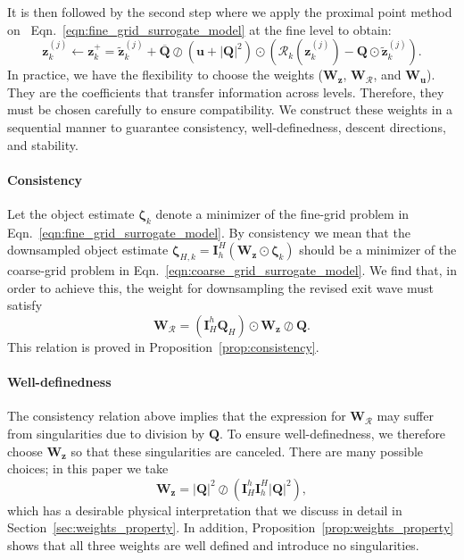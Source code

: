 \documentclass{article}
\numberwithin{equation}{section}
\begin{document}
It is then followed by the second step where we apply the proximal point method on~ Eqn.~\eqref{eqn:fine_grid_surrogate_model} at the fine level to obtain:
\begin{equation*} 
\bm{z}_k^{(j)} \leftarrow \bm{z}_k^+ = \widetilde{\bm{z}}_k^{(j)} + \overline{\bm{Q}}\oslash\left(\bm{u} + |\bm{Q}|^2\right)\odot\left(\mathcal{R}_k\left(\bm{z}_k^{(j)}\right) - \bm{Q}\odot\widetilde{\bm{z}}_k^{(j)}\right).
\end{equation*}
In practice, we have the flexibility to choose the weights ($\bm{W}_{\bm{z}}$, $\bm{W}_{\mathcal{R}}$, and $\bm{W}_{\bm{u}}$). They are the coefficients that transfer information across levels. Therefore, they must be chosen carefully to ensure compatibility. We construct these weights in a sequential manner to guarantee consistency, well-definedness, descent directions, and stability.

\paragraph{Consistency}
Let the object estimate $\bm{\zeta}_k$ denote a minimizer of the fine-grid problem in Eqn.~\eqref{eqn:fine_grid_surrogate_model}. By consistency we mean that the downsampled object estimate $\bm{\zeta}_{H,k} = \bm{I}_h^H\left(\bm{W}_{\bm{z}}\odot\bm{\zeta}_k\right)$ should be a minimizer of the coarse-grid problem in Eqn.~\eqref{eqn:coarse_grid_surrogate_model}. We find that, in order to achieve this, the weight for downsampling the revised exit wave must satisfy
\[
\bm{W}_{\mathcal{R}} = (\bm{I}_H^h\bm{Q}_H)\odot\bm{W}_{\bm{z}}\oslash\bm{Q}.
\]
This relation is proved in Proposition~\ref{prop:consistency}.

\paragraph{Well-definedness}
The consistency relation above implies that the expression for $\bm{W}_{\mathcal{R}}$ may suffer from singularities due to division by $\bm{Q}$. To ensure well-definedness, we therefore choose $\bm{W}_{\bm{z}}$ so that these singularities are canceled. There are many possible choices; in this paper we take
\[
\bm{W}_{\bm{z}} = |\bm{Q}|^2\oslash\left(\bm{I}_H^h\bm{I}_h^H|\bm{Q}|^2\right),
\]
which has a desirable physical interpretation that we discuss in detail in Section~\ref{sec:weights_property}. In addition, Proposition~\ref{prop:weights_property} shows that all three weights are well defined and introduce no singularities.
\end{document}
